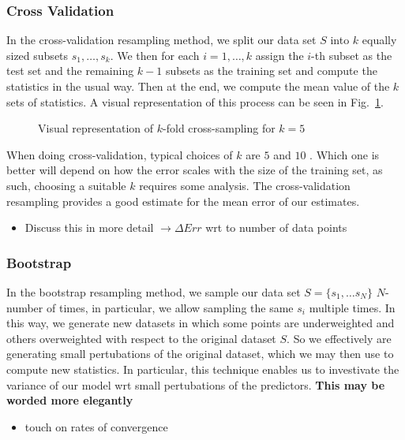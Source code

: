 \documentclass[reprint, english, nofootinbib]{revtex4-2}
\begin{document}
        \subsubsection{Cross Validation}
            \noindent
            In the cross-validation resampling method, we split our data set $S$ into $k$ equally sized subsets $s_1, \dots, s_k$.
            We then for each $i = 1,\dots, k$ assign the $i$-th subset as the test set and the remaining $k-1$ subsets as the training set and compute the statistics in the usual way. Then at the end, we compute the mean value of the $k$ sets of statistics. A visual representation of this process can be seen in Fig.~\ref{fig: Cross Validation}.
            \begin{figure}[h!tb]
                \center
                
                \caption{\label{fig: Cross Validation}Visual representation of $k$-fold cross-sampling for $k=5$}
            \end{figure}
            When doing cross-validation, typical choices of $k$ are $5$ and $10$ \cite{hastie}. Which one is better will depend on how the error scales with the size of the training set, as such, choosing a suitable $k$ requires some analysis.
            The cross-validation resampling provides a good estimate for the mean error of our estimates.
            \begin{itemize}
                \item Discuss this in more detail $\rightarrow\Delta Err$ wrt to number of data points
            \end{itemize}
        \subsubsection{Bootstrap}
            \noindent
            In the bootstrap resampling method, we sample our data set $S = \{s_1, \dots s_N\}$ $N$-number of times, in particular, we allow sampling the same $s_i$ multiple times. In this way, we generate new datasets in which some points are underweighted and others overweighted with respect to the original dataset $S$. So we effectively are generating small pertubations of the original dataset, which we may then use to compute new statistics.
            In particular, this technique enables us to investivate the variance of our model wrt small pertubations of the predictors. \textbf{This may be worded more elegantly}
            \begin{itemize}
                \item touch on rates of convergence
            \end{itemize}
\end{document}
